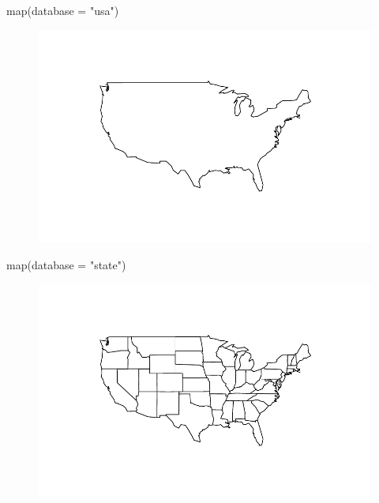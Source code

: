 \documentclass[
  letterpaper,
  DIV=11,
  numbers=noendperiod]{scrreprt}
\newenvironment{Shaded}{\begin{snugshade}}{\end{snugshade}}
\newcommand{\AttributeTok}[1]{\textcolor[rgb]{0.40,0.45,0.13}{#1}}
\newcommand{\FunctionTok}[1]{\textcolor[rgb]{0.28,0.35,0.67}{#1}}
\newcommand{\NormalTok}[1]{\textcolor[rgb]{0.00,0.23,0.31}{#1}}
\newcommand{\StringTok}[1]{\textcolor[rgb]{0.13,0.47,0.30}{#1}}
\begin{document}
\begin{Shaded}
\begin{Highlighting}[]
\FunctionTok{map}\NormalTok{(}\AttributeTok{database =} \StringTok{"usa"}\NormalTok{)}
\end{Highlighting}
\end{Shaded}

\begin{figure}[H]

{\centering \includegraphics{12-Maps_files/figure-pdf/unnamed-chunk-4-1.pdf}

}

\end{figure}

\begin{Shaded}
\begin{Highlighting}[]
\FunctionTok{map}\NormalTok{(}\AttributeTok{database =} \StringTok{"state"}\NormalTok{)}
\end{Highlighting}
\end{Shaded}

\begin{figure}[H]

{\centering \includegraphics{12-Maps_files/figure-pdf/unnamed-chunk-5-1.pdf}

}

\end{figure}
\end{document}
